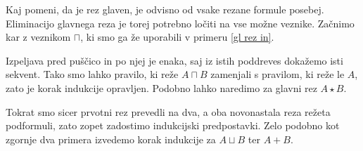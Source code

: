 Kaj pomeni, da je rez glaven, je odvisno od vsake rezane formule posebej. Eliminacijo glavnega reza je torej potrebno ločiti na vse možne veznike. Začnimo kar z veznikom $\sqcap$, ki smo ga že uporabili v primeru \ref{gl rez in}.
\begin{prooftree}


\end{prooftree}
\dol
\begin{prooftree}
\end{prooftree}
Izpeljava pred puščico in po njej je enaka, saj iz istih poddreves dokažemo isti sekvent. Tako smo lahko pravilo, ki reže $A \sqcap B$ zamenjali s pravilom, ki reže le $A$, zato je korak indukcije opravljen. Podobno lahko naredimo za glavni rez $A \star B$.
\begin{prooftree}


\end{prooftree}
\dol
\begin{prooftree}

\end{prooftree}
Tokrat smo sicer prvotni rez prevedli na dva, a oba novonastala reza režeta podformuli, zato zopet zadostimo indukcijski predpostavki. Zelo podobno kot zgornje dva primera izvedemo korak indukcije za $A \sqcup B$ ter $A+B$.
